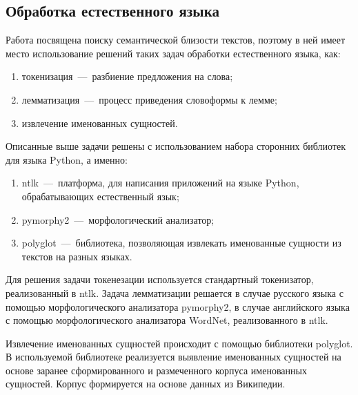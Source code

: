 \subsection{Обработка естественного языка}
    Работа посвящена поиску семантической близости текстов, поэтому в ней имеет место использование решений таких задач обработки естественного языка, как:
    \begin{enumerate}
        \item токенизация~---~разбиение предложения на слова;
        \item лемматизация~---~процесс приведения словоформы к лемме;
        \item извлечение именованных сущностей.
    \end{enumerate}
    Описанные выше задачи решены с использованием набора сторонних библиотек для языка Python, а именно:
    \begin{enumerate}
        \item ntlk~---~платформа, для написания приложений на языке Python, обрабатывающих естественный язык;
        \item pymorphy2~---~морфологический анализатор;
        \item polyglot~---~библиотека, позволяющая извлекать именованные сущности из текстов на разных языках.
    \end{enumerate}

    Для решения задачи токенезации используется стандартный токенизатор, реализованный в ntlk.
    Задача лемматизации решается в случае русского языка с помощью морфологического анализатора pymorphy2,
    в случае английского языка с помощью морфологического анализатора WordNet, реализованного в ntlk.

    Извлечение именованных сущностей происходит с помощью библиотеки polyglot.
    В используемой библиотеке реализуется выявление именованных сущностей на основе заранее сформированного и размеченного корпуса именованных сущностей.
    Корпус формируется на основе данных из Википедии.
%
%
%
%
%
%
%
%
